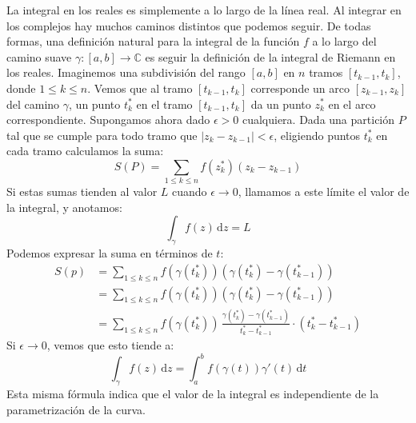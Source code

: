   La integral en los reales
  es simplemente a lo largo de la línea real.
  Al integrar en los complejos
  hay muchos caminos distintos que podemos seguir.
  De todas formas,
  una definición natural para la integral de la función \(f\)
  a lo largo del camino suave
    \(\gamma \colon [a, b] \rightarrow \mathbb{C}\)
  es seguir la definición de la integral de Riemann en los reales.
  Imaginemos una subdivisión del rango \([a, b]\) en \(n\) tramos
  \([t_{k - 1}, t_k]\),
  donde \(1 \le k \le n\).
  Vemos que al tramo \([t_{k - 1}, t_k]\)
  corresponde un arco \([z_{k - 1}, z_k]\) del camino \(\gamma\),
  un punto \(t_k^*\) en el tramo \([t_{k - 1}, t_k]\)
  da un punto \(z_k^*\) en el arco correspondiente.
  Supongamos ahora dado \(\epsilon > 0\) cualquiera.
  Dada una partición \(P\) tal que se cumple para todo tramo
  que \(\lvert z_k - z_{k - 1} \rvert < \epsilon\),
  eligiendo puntos \(t_k^*\) en cada tramo
  calculamos la suma:
  \begin{equation*}
    S(P)
      = \sum_{1 \le k \le n} f(z_k^*) (z_k - z_{k - 1})
  \end{equation*}
  Si estas sumas tienden al valor \(L\)
  cuando \(\epsilon \rightarrow 0\),
  llamamos a este límite el valor de la integral,
  y anotamos:
  \begin{equation*}
    \int_\gamma f(z) \, \mathrm{d} z
      = L
  \end{equation*}
  Podemos expresar la suma en términos de \(t\):
  \begin{align*}
    S(p)
      &= \sum_{1 \le k \le n}
	   f(\gamma(t_k^*)) (\gamma(t_k^*) - \gamma(t_{k - 1}^*)) \\
      &= \sum_{1 \le k \le n}
	   f(\gamma(t_k^*)) (\gamma(t_k^*) - \gamma(t_{k - 1}^*)) \\
      &= \sum_{1 \le k \le n}
	   f(\gamma(t_k^*)) \,
	     \frac{\gamma(t_k^*) - \gamma(t_{k - 1}^*)}
		  {t_k^* - t_{k - 1}^*}
	     \cdot (t_k^* - t_{k - 1}^*)
  \end{align*}
  Si \(\epsilon \rightarrow 0\),
  vemos que esto tiende a:
  \begin{equation}
    \label{eq:complex-integral-parametrized}
    \int_\gamma f(z) \, \mathrm{d} z
      = \int_a^b f(\gamma(t)) \gamma'(t) \, \mathrm{d} t
  \end{equation}
  Esta misma fórmula indica que el valor de la integral
  es independiente de la parametrización de la curva.

